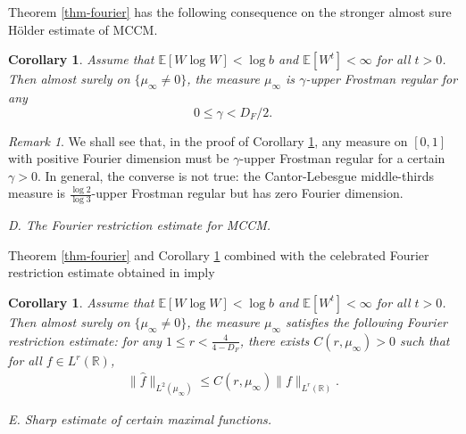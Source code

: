 \documentclass[12pt]{amsart}
\newtheorem{corollary}[theorem]{Corollary}
\theoremstyle{definition}
\theoremstyle{remark}
\newtheorem*{remark*}{Remark}
\newcommand{\R}{\mathbb{R}}
\newcommand{\E}{\mathbb{E}}
\numberwithin{equation}{section}
\begin{document}
Theorem \ref{thm-fourier} has the following consequence on the stronger almost sure H\"older estimate of MCCM. 
 
\begin{corollary}\label{cor-holder}
Assume that $\E[W\log W]<\log b$ and $\E[W^t]<\infty$ for all $t>0$.   Then   almost surely on $\{\mu_\infty\ne 0\}$,  the measure $\mu_\infty$ is $\gamma$-upper Frostman regular for any 
\[
0\le \gamma< D_F/2. 
\]
\end{corollary}


\begin{remark*}
We shall see that, in the proof of Corollary \ref{cor-holder},  any measure on $[0,1]$ with positive Fourier dimension must be $\gamma$-upper Frostman regular for a certain $\gamma>0$.  In general, the converse is not true: the Cantor-Lebesgue  middle-thirds measure is $\frac{\log 2}{\log 3}$-upper Frostman regular but has zero Fourier dimension.  
\end{remark*}

{\flushleft \it D. The Fourier restriction estimate for MCCM. }

Theorem \ref{thm-fourier} and Corollary \ref{cor-holder} combined with the celebrated Fourier restriction estimate obtained in \cite[Theorem~4.1]{M00}   imply 

\begin{corollary}
Assume that $\E[W\log W]<\log b$ and $\E[W^t]<\infty$ for all $t>0$.   Then   almost surely on $\{\mu_\infty\ne 0\}$,  the measure $\mu_\infty$ satisfies the following Fourier restriction estimate: for any $1\le r< \frac{4}{4-D_F}$,  there exists $C(r, \mu_\infty)>0$ such that for all $f\in L^r(\R)$, 
\begin{align}\label{F-R-ineq}
\| \widehat{f}\|_{L^2(\mu_\infty)} \le C(r, \mu_\infty) \| f\|_{L^r(\R)}. 
\end{align}
\end{corollary}







{\flushleft  \it E. Sharp estimate of certain maximal functions.}
\end{document}
